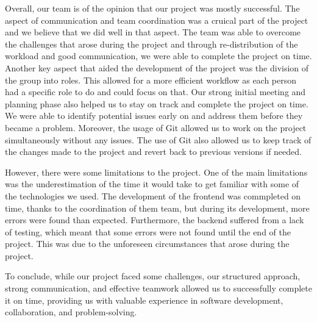\documentclass{article}
\begin{document}
    Overall, our team is of the opinion that our project was mostly successful. The aspect of communication and team coordination was a cruical part of the project and we believe that we did well in that aspect. The team was able to overcome the 
    challenges that arose during the project and through re-distribution of the workload and good communication, we were able to complete the project on time. Another key aspect that aided the development of the project was the division of the group 
    into roles. This allowed for a more efficient workflow as each person had a specific role to do and could focus on that. Our strong initial meeting and planning phase also helped us to stay on track and complete the project on time. We were able to
    identify potential issues early on and address them before they became a problem. Moreover, the usage of Git allowed us to work on the project simultaneously without any issues. The use of Git also allowed us to keep track of the changes made to 
    the project and revert back to previous versions if needed.

    However, there were some limitations to the project. One of the main limitations was the underestimation of the time it would take to get familiar with some of the technologies we used. The development of the frontend was commpleted on time, thanks to the
    coordination of them team, but during its development, more errors were found than expected. Furthermore, the backend suffered from a lack of testing, which meant that some errors were not found until the end of the project. This was due to the unforeseen
    circumstances that arose during the project.

    To conclude, while our project faced some challenges, our structured approach, strong communication, and effective teamwork allowed us to successfully complete it on time, providing us with valuable experience in software development, collaboration, and 
    problem-solving.
\end{document}
